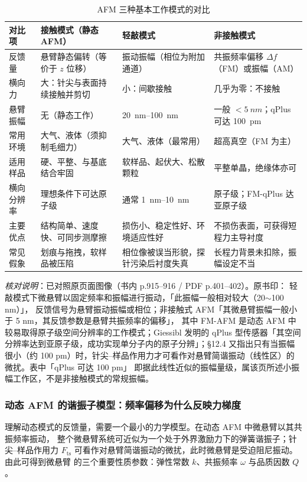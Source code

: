\begin{table}[htbp]
\centering
\caption{AFM 三种基本工作模式的对比}
\label{tab:afm-modes}
{\srcsize
\begin{tabularx}{\columnwidth}{@{}lXXX@{}}
\toprule
对比项 & 接触模式（静态 AFM） & 轻敲模式 & 非接触模式 \\
\midrule
反馈量 & 悬臂静态偏转（等价于 $z$ 位移） & 振动振幅（相位为附加通道） & 共振频率偏移 $\Delta f$（FM）或振幅（AM） \\
横向力 & 大：针尖与表面持续接触并剪切 & 小：间歇接触 & 几乎为零：不接触 \\
悬臂振幅 & 无（静态工作） & \qtyrange{20}{100}{nm} & 一般 $<\qty{5}{nm}$；qPlus 可达 \qty{100}{pm} \\
常用环境 & 大气、液体（须抑制毛细力） & 大气、液体（最常用） & 超高真空（FM 为主） \\
适用样品 & 硬、平整、与基底结合牢固 & 软样品、起伏大、松散颗粒 & 平整单晶，绝缘体亦可 \\
横向分辨率 & 理想条件下可达原子级 & 通常 \qtyrange{1}{10}{nm} & 原子级；FM-qPlus 达亚原子级 \\
主要优点 & 结构简单、速度快、可同步测摩擦 & 损伤小、稳定性好、环境适应性好 & 不损伤表面，可获得短程力主导衬度 \\
常见假象 & 划痕与拖拽，软样品被压陷 & 相位像被误当形貌，探针污染后衬度失真 & 长程力背景未扣除，振幅设定不当 \\
\bottomrule
\end{tabularx}}
\end{table}
\emph{核对说明}：已对照原页面图像（书内 p.915--916 / PDF p.401--402）。原书印：
轻敲模式下微悬臂以固定频率和振幅进行振动，「此振幅一般相对较大（20$\sim$100 nm）」，
反馈信号为悬臂振动振幅或相位；非接触式 AFM「其微悬臂振幅一般小于 5 nm，其反馈参数是悬臂共振频率的偏移」，
其中 FM-AFM 是动态 AFM 中较易取得原子级空间分辨率的工作模式；Giessibl 发明的 qPlus
型传感器「其空间分辨率达到亚原子级，成功实现单分子内的原子分辨」；§12.4 又指出只有当振幅很小（约 100
pm）时，针尖--样品作用力才可看作对悬臂简谐振动（线性区）的微扰。表中「qPlus 可达 100 pm」
即据此线性近似的振幅量级，属该页所述小振幅工作区，不是非接触模式的常规振幅。

\subsubsection{动态 AFM 的谐振子模型：频率偏移为什么反映力梯度}

理解动态模式的反馈量，需要一个最小的力学模型。在动态 AFM 中微悬臂以其共振频率振动，
整个微悬臂系统可近似为一个处于外界激励力下的弹簧谐振子；针尖--样品作用力
$F_{\mathrm{ts}}$ 可看作对悬臂简谐振动的微扰，此时微悬臂是受迫阻尼振动。由此可得到微悬臂
的三个重要性质参数：弹性常数 $k$、共振频率 $\omega$ 与品质因数 $Q$
。

